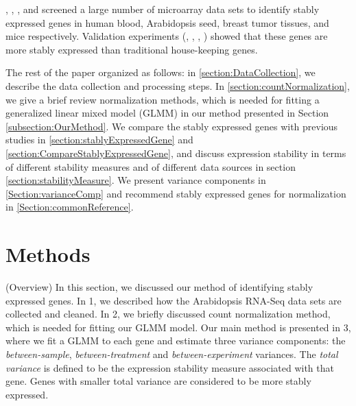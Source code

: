 \documentclass[11pt, a4paper]{article}
\begin{document}
\cite{stamova2009identification},  \citet{dekkers2012identification}, \citet{gur2009identification}, and
 \citet{frericks2008toolbox} screened a large number of microarray data sets
 to identify stably expressed genes in human blood, Arabidopsis seed, breast tumor tissues,
 and mice respectively.
Validation experiments (\cite{czechowski2005genome},
\cite{dekkers2012identification}, \cite{huggett2005real},
\cite{stamova2009identification}) showed that these genes are more stably
expressed than traditional house-keeping genes.  




The rest of the paper organized as follows: in \ref{section:DataCollection}, we describe the data collection and processing steps. In \ref{section:countNormalization}, we give a brief review normalization methods, which is needed for fitting a generalized linear mixed model (GLMM) \citep{mccullagh1989generalized} in our method presented in Section \ref{subsection:OurMethod}. We compare the stably expressed genes with previous studies in \ref{section:stablyExpressedGene} and \ref{section:CompareStablyExpressedGene}, and discuss expression stability in terms of different stability measures and of different data sources in section \ref{section:stabilityMeasure}. We present variance components in \ref{Section:varianceComp} and recommend stably expressed genes for normalization in \ref{Section:commonReference}.

\section{Methods} \label{section:Methods}
(Overview) In this section, we discussed our method of identifying stably expressed genes. In 1, we described how the Arabidopsis RNA-Seq data sets are collected and cleaned. In 2, we briefly discussed count normalization method, which is needed for fitting our GLMM model. Our main method is presented in 3, where we fit a GLMM to each gene and estimate three variance components: the \textit{between-sample}, \textit{between-treatment} and \textit{between-experiment} variances.
 The \textit{total variance} is defined to be the expression stability measure associated with that gene. Genes with smaller total variance are considered to be more stably expressed. 
\end{document}
